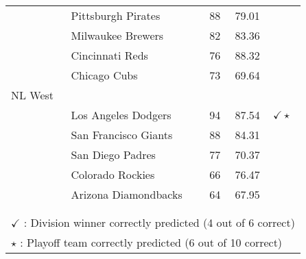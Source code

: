 \documentclass{article} %
\begin{document}
\begin{table}[h!]
\begin{center}
\begin{tabular}{llccl}
& Pittsburgh Pirates & 88 & 79.01 & \\
& Milwaukee Brewers & 82 & 83.36 & \\
& Cincinnati Reds & 76 & 88.32 & \\
& Chicago Cubs & 73 & 69.64 & \\
NL West & & & & \\
& Los Angeles Dodgers & 94 & 87.54 & $\checkmark 	\star $ \\
& San Francisco Giants & 88 & 84.31 & \\
& San Diego Padres & 77 & 70.37 & \\
& Colorado Rockies & 66 & 76.47 & \\
& Arizona Diamondbacks & 64 & 67.95 & \\
\\ \hline \\
\multicolumn{5}{l}{ $\checkmark$ : Division winner correctly predicted (4 out of 6 correct) } \\
\multicolumn{5}{l}{ $\star$ : Playoff team correctly predicted (6 out of 10 correct) } \\

\end{tabular}
\end{center}
\end{table}
\end{document}
